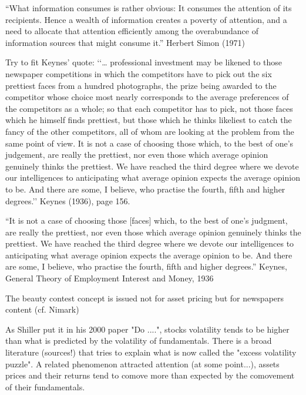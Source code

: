 

“What information consumes is rather obvious: It consumes the
attention of its recipients. Hence a wealth of information creates a
poverty of attention, and a need to allocate that attention efficiently
among the overabundance of information sources that might
consume it.”
Herbert Simon (1971)


Try to fit Keynes' quote:
‘‘… professional investment may be likened to those newspaper competitions in which the competitors have to pick out the six prettiest faces from a hundred photographs, the prize being awarded to the competitor whose choice most nearly corresponds to the average preferences of the competitors as a whole; so that each competitor has to pick, not those faces which he himself finds prettiest, but those which he thinks likeliest to catch the fancy of the other competitors, all of whom are looking at the problem from the same point of view. It is not a case of choosing those which, to the best of one’s judgement, are really the prettiest, nor even those which average opinion genuinely thinks the prettiest. We have reached the third degree where we devote our intelligences to anticipating what average opinion expects the average opinion to be. And there are some, I believe, who practise the fourth, fifth and higher degrees.’’ Keynes (1936), page 156.


“It is not a case of choosing those [faces] which, to the best of one’s judgment, are really
the prettiest, nor even those which average opinion genuinely thinks the prettiest. We have
reached the third degree where we devote our intelligences to anticipating what average opinion expects the average opinion to be. And there are some, I believe, who practise the fourth,
fifth and higher degrees.” Keynes, General Theory of Employment Interest and Money, 1936


The beauty contest concept is issued not for asset pricing but for newspapers content (cf. Nimark)


As Shiller put it in his 2000 paper "Do ....", stocks volatility tends to be higher than what is predicted by the volatility of fundamentals. There is a broad literature (sources!) that tries to explain what is now called the "excess volatility puzzle". A related phenomenon attracted attention (at some point...), assets prices and their returns tend to comove more than expected by the comovement of their fundamentals.



